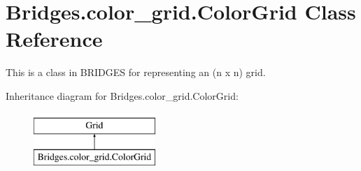 \hypertarget{class_bridges_1_1color__grid_1_1_color_grid}{}\section{Bridges.\+color\+\_\+grid.\+Color\+Grid Class Reference}
\label{class_bridges_1_1color__grid_1_1_color_grid}


This is a class in B\+R\+I\+D\+G\+ES for representing an (n x n) grid.  


Inheritance diagram for Bridges.\+color\+\_\+grid.\+Color\+Grid\+:\begin{figure}[H]
\begin{center}
\leavevmode
\includegraphics[height=2.000000cm]{class_bridges_1_1color__grid_1_1_color_grid}
\end{center}
\end{figure}
